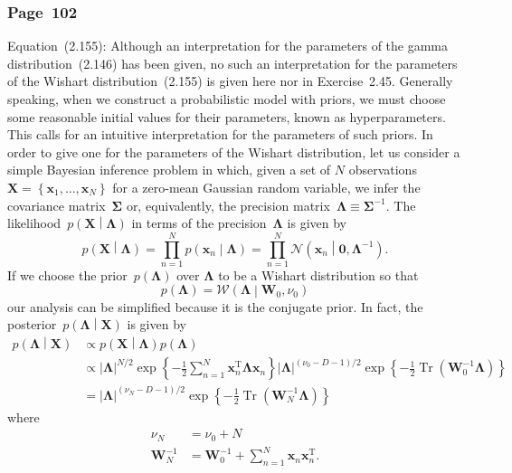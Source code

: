 \documentclass[12pt,a4paper]{article}
\newcommand{\erratum}[1]{%
\subsubsection*{#1}
\addcontentsline{toc}{subsection}{#1}}
\begin{document}
\erratum{Page~102}
Equation~(2.155):
Although an interpretation for the parameters of the gamma distribution~(2.146) has been given,
no such an interpretation for the parameters of the Wishart distribution~(2.155) is given here
nor in Exercise~2.45.
Generally speaking, when we construct a probabilistic model with priors,
we must choose some reasonable initial values for their parameters, known as hyperparameters.
This calls for an intuitive interpretation for the parameters of such priors.
In order to give one for the parameters of the Wishart distribution,
let us consider a simple Bayesian inference problem in which,
given a set of $N$ observations~$\mathbf{X} =
\left\{ \mathbf{x}_1, \dots, \mathbf{x}_N \right\}$ for a zero-mean Gaussian random variable,
we infer the covariance matrix~$\bm{\Sigma}$ or, equivalently,
the precision matrix~$\bm{\Lambda} \equiv \bm{\Sigma}^{-1}$.
The likelihood~$p\left(\mathbf{X}\middle|\bm{\Lambda}\right)$
in terms of the precision~$\bm{\Lambda}$ is given by
\begin{equation}
p\left(\mathbf{X}\middle|\bm{\Lambda}\right) =
\prod_{n=1}^{N} p\left(\mathbf{x}_n\middle|\bm{\Lambda}\right) =
\prod_{n=1}^{N} \mathcal{N}\left(\mathbf{x}_n\middle|\mathbf{0}, \bm{\Lambda}^{-1}\right) .
\end{equation}
If we choose the prior~$p\left(\bm{\Lambda}\right)$ over $\bm{\Lambda}$ to be
a Wishart distribution so that
\begin{equation}
p\left(\bm{\Lambda}\right) = \mathcal{W}\left(\bm{\Lambda}\middle|\mathbf{W}_0, \nu_0\right)
\label{eq:wishart_prior}
\end{equation}
our analysis can be simplified because it is the conjugate prior.
In fact, the posterior~$p\left(\bm{\Lambda}\middle|\mathbf{X}\right)$ is given by
\begin{align}
p\left(\bm{\Lambda}\middle|\mathbf{X}\right) &\propto
p\left(\mathbf{X}\middle|\bm{\Lambda}\right) p\left(\bm{\Lambda}\right) \\
&\propto \left|\bm{\Lambda}\right|^{N/2}
\exp\left\{-\frac{1}{2}\sum_{n=1}^{N}\mathbf{x}_n^{\operatorname{T}}\bm{\Lambda}\mathbf{x}_n\right\}
\left|\bm{\Lambda}\right|^{(\nu_0 - D - 1)/2}
\exp\left\{-\frac{1}{2}\operatorname{Tr}\left(\mathbf{W}_0^{-1}\bm{\Lambda}\right)\right\} \\
&= \left|\bm{\Lambda}\right|^{(\nu_N - D - 1)/2}
\exp\left\{-\frac{1}{2}\operatorname{Tr}\left(\mathbf{W}_N^{-1}\bm{\Lambda}\right)\right\}
\end{align}
where
\begin{align}
\nu_N &= \nu_0 + N \\
\mathbf{W}_N^{-1} &=
\mathbf{W}_0^{-1} + \sum_{n=1}^{N}\mathbf{x}_n\mathbf{x}_n^{\operatorname{T}} .
\end{align}
\end{document}
